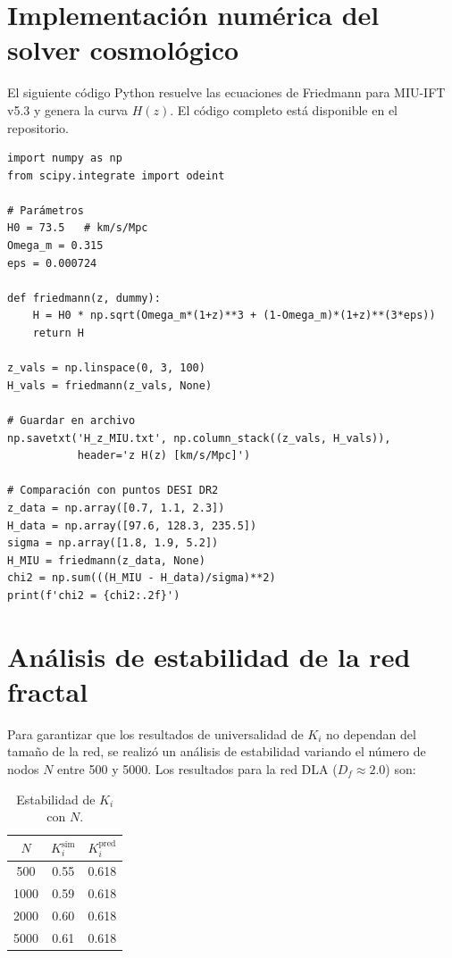 \documentclass[12pt, a4paper]{article}
\theoremstyle{miuThm}
\theoremstyle{remark}
\begin{document}
\clearpage
\section{Implementación numérica del solver cosmológico}

El siguiente código Python resuelve las ecuaciones de Friedmann para MIU-IFT v5.3 y genera la curva $H(z)$. El código completo está disponible en el repositorio.

\begin{verbatim}
import numpy as np
from scipy.integrate import odeint

# Parámetros
H0 = 73.5   # km/s/Mpc
Omega_m = 0.315
eps = 0.000724

def friedmann(z, dummy):
    H = H0 * np.sqrt(Omega_m*(1+z)**3 + (1-Omega_m)*(1+z)**(3*eps))
    return H

z_vals = np.linspace(0, 3, 100)
H_vals = friedmann(z_vals, None)

# Guardar en archivo
np.savetxt('H_z_MIU.txt', np.column_stack((z_vals, H_vals)), 
           header='z H(z) [km/s/Mpc]')

# Comparación con puntos DESI DR2
z_data = np.array([0.7, 1.1, 2.3])
H_data = np.array([97.6, 128.3, 235.5])
sigma = np.array([1.8, 1.9, 5.2])
H_MIU = friedmann(z_data, None)
chi2 = np.sum(((H_MIU - H_data)/sigma)**2)
print(f'chi2 = {chi2:.2f}')
\end{verbatim}

\clearpage
\section{Análisis de estabilidad de la red fractal}

Para garantizar que los resultados de universalidad de $K_i$ no dependan del tamaño de la red, se realizó un análisis de estabilidad variando el número de nodos $N$ entre 500 y 5000. Los resultados para la red DLA ($D_f\approx2.0$) son:

\begin{table}[h!]
\centering
\caption{Estabilidad de $K_i$ con $N$.}
\label{tab:estabilidad}
\begin{tabular}{ccc}
\toprule
$N$ & $K_i^{\text{sim}}$ & $K_i^{\text{pred}}$ \\
\midrule
500 & 0.55 & 0.618 \\
1000 & 0.59 & 0.618 \\
2000 & 0.60 & 0.618 \\
5000 & 0.61 & 0.618 \\
\bottomrule
\end{tabular}
\end{table}
\end{document}

